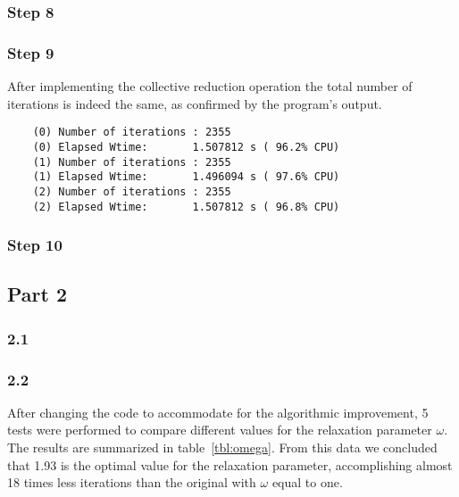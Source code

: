 \subsubsection{Step 8}
\subsubsection{Step 9}

After implementing the collective reduction operation the total number of iterations is indeed the same, as confirmed by the program's output.

\begin{lstlisting}
    (0) Number of iterations : 2355
    (0) Elapsed Wtime:       1.507812 s ( 96.2% CPU)
    (1) Number of iterations : 2355
    (1) Elapsed Wtime:       1.496094 s ( 97.6% CPU)
    (2) Number of iterations : 2355
    (2) Elapsed Wtime:       1.507812 s ( 96.8% CPU)
\end{lstlisting}

\subsubsection{Step 10}


\subsection{Part 2}

\subsubsection{2.1}
\subsubsection{2.2}

After changing the code to accommodate for the algorithmic improvement, 5 tests were performed to compare different values for the relaxation parameter $\omega$. The results are summarized in table~\ref{tbl:omega}.
From this data we concluded that 1.93 is the optimal value for the relaxation parameter, accomplishing almost 18 times less iterations than the original with $\omega$ equal to one.

